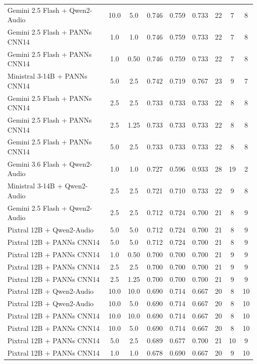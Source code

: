 {\begin{longtable}{lcccccccc}
    Gemini 2.5 Flash + Qwen2-Audio & 10.0 & 5.0 & 0.746 & 0.759 & 0.733 & 22 & 7 & 8 \\
    Gemini 2.5 Flash + PANNs CNN14 & 1.0 & 1.0 & 0.746 & 0.759 & 0.733 & 22 & 7 & 8 \\
    Gemini 2.5 Flash + PANNs CNN14 & 1.0 & 0.50 & 0.746 & 0.759 & 0.733 & 22 & 7 & 8 \\
    Ministral 3-14B + PANNs CNN14 & 5.0 & 2.5 & 0.742 & 0.719 & 0.767 & 23 & 9 & 7 \\
    Gemini 2.5 Flash + PANNs CNN14 & 2.5 & 2.5 & 0.733 & 0.733 & 0.733 & 22 & 8 & 8 \\
    Gemini 2.5 Flash + PANNs CNN14 & 2.5 & 1.25 & 0.733 & 0.733 & 0.733 & 22 & 8 & 8 \\
    Gemini 2.5 Flash + PANNs CNN14 & 5.0 & 2.5 & 0.733 & 0.733 & 0.733 & 22 & 8 & 8 \\
    Gemini 3.6 Flash + Qwen2-Audio & 1.0 & 1.0 & 0.727 & 0.596 & 0.933 & 28 & 19 & 2 \\
    Ministral 3-14B + Qwen2-Audio & 2.5 & 2.5 & 0.721 & 0.710 & 0.733 & 22 & 9 & 8 \\
    Gemini 2.5 Flash + Qwen2-Audio & 2.5 & 2.5 & 0.712 & 0.724 & 0.700 & 21 & 8 & 9 \\
    Pixtral 12B + Qwen2-Audio & 5.0 & 5.0 & 0.712 & 0.724 & 0.700 & 21 & 8 & 9 \\
    Pixtral 12B + PANNs CNN14 & 5.0 & 5.0 & 0.712 & 0.724 & 0.700 & 21 & 8 & 9 \\
    Pixtral 12B + PANNs CNN14 & 1.0 & 0.50 & 0.700 & 0.700 & 0.700 & 21 & 9 & 9 \\
    Pixtral 12B + PANNs CNN14 & 2.5 & 2.5 & 0.700 & 0.700 & 0.700 & 21 & 9 & 9 \\
    Pixtral 12B + PANNs CNN14 & 2.5 & 1.25 & 0.700 & 0.700 & 0.700 & 21 & 9 & 9 \\
    Pixtral 12B + Qwen2-Audio & 10.0 & 10.0 & 0.690 & 0.714 & 0.667 & 20 & 8 & 10 \\
    Pixtral 12B + Qwen2-Audio & 10.0 & 5.0 & 0.690 & 0.714 & 0.667 & 20 & 8 & 10 \\
    Pixtral 12B + PANNs CNN14 & 10.0 & 10.0 & 0.690 & 0.714 & 0.667 & 20 & 8 & 10 \\
    Pixtral 12B + PANNs CNN14 & 10.0 & 5.0 & 0.690 & 0.714 & 0.667 & 20 & 8 & 10 \\
    Pixtral 12B + PANNs CNN14 & 5.0 & 2.5 & 0.689 & 0.677 & 0.700 & 21 & 10 & 9 \\
    Pixtral 12B + PANNs CNN14 & 1.0 & 1.0 & 0.678 & 0.690 & 0.667 & 20 & 9 & 10 \\

\end{longtable}}
